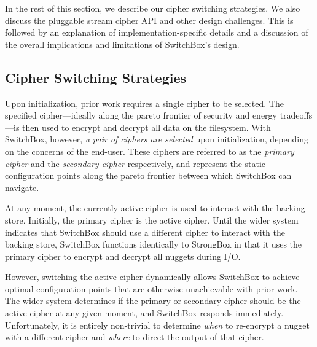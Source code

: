 In the rest of this section, we describe our cipher switching strategies. We
also discuss the pluggable stream cipher API and other design challenges. This
is followed by an explanation of implementation-specific details and a
discussion of the overall implications and limitations of SwitchBox's design.

\subsection{Cipher Switching Strategies}

Upon initialization, prior work requires a single cipher to be selected. The
specified cipher---ideally along the pareto frontier of security and energy
tradeoffs---is then used to encrypt and decrypt all data on the filesystem. With
SwitchBox, however, \emph{a pair of ciphers are selected} upon initialization,
depending on the concerns of the end-user. These ciphers are referred to as the
\emph{primary cipher} and the \emph{secondary cipher} respectively, and
represent the static configuration points along the pareto frontier between
which SwitchBox can navigate. 

At any moment, the currently active cipher is used to interact with the backing
store. Initially, the primary cipher is the active cipher. Until the wider
system indicates that SwitchBox should use a different cipher to interact with
the backing store, SwitchBox functions identically to StrongBox in that it uses
the primary cipher to encrypt and decrypt all nuggets during I/O.

However, switching the active cipher dynamically allows SwitchBox to achieve
optimal configuration points that are otherwise unachievable with prior work.
The wider system determines if the primary or secondary cipher should be the
active cipher at any given moment, and SwitchBox responds immediately.
Unfortunately, it is entirely non-trivial to determine \emph{when} to re-encrypt
a nugget with a different cipher and \emph{where} to direct the output of that
cipher. 

